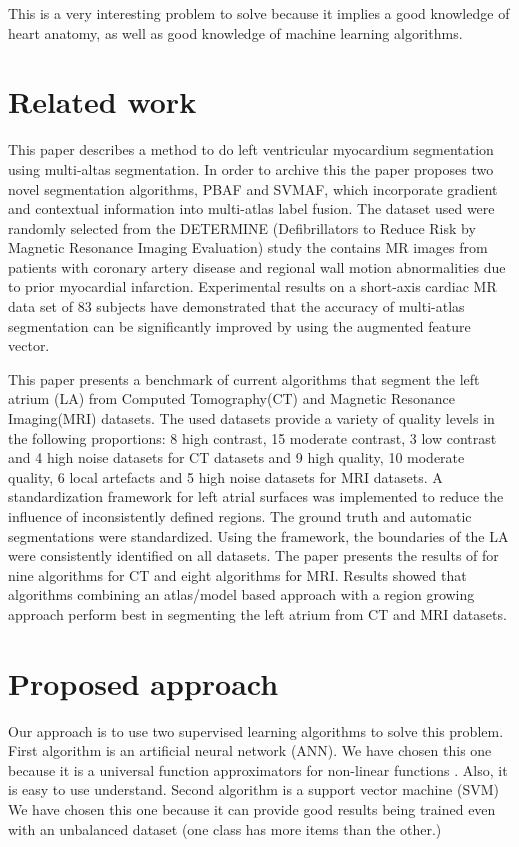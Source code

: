 \documentclass[12pt]{report}
\begin{document}
This is a very interesting problem to solve because it implies a good knowledge of heart anatomy, as well as good knowledge of machine learning algorithms. 

\chapter{Related work}
This paper \cite{bai1} describes a method to do left ventricular myocardium segmentation using multi-altas segmentation. In order to archive this the paper proposes two novel segmentation algorithms, PBAF and SVMAF, which incorporate gradient and contextual information into multi-atlas label fusion. The dataset used were randomly selected from the DETERMINE (Defibrillators to Reduce Risk by Magnetic Resonance Imaging Evaluation) study the contains MR images from patients with coronary artery disease and regional wall motion abnormalities due to prior myocardial infarction. Experimental results on a short-axis cardiac MR data set of 83 subjects have demonstrated that the accuracy of multi-atlas segmentation can be significantly improved by using the augmented feature vector.

This paper \cite{gomez1} presents a benchmark of current algorithms that segment the left atrium (LA) from  Computed Tomography(CT) and  Magnetic Resonance Imaging(MRI) datasets. The used datasets provide a variety of quality levels in the following proportions: 8 high contrast, 15 moderate contrast, 3 low contrast and 4 high noise datasets for CT datasets  and 9 high quality, 10 moderate quality, 6 local artefacts and 5 high noise datasets for MRI datasets. A standardization framework for left atrial surfaces was implemented  to reduce the influence of inconsistently defined regions. The ground truth and automatic segmentations were standardized. Using the framework, the boundaries of the LA were consistently identified on all datasets. The paper presents the results of  for nine algorithms for CT and eight algorithms for MRI. Results showed that algorithms combining an atlas/model based approach with a region growing approach perform best in segmenting the left atrium from CT and MRI datasets.

\chapter{Proposed approach}

Our approach is to use two supervised learning algorithms to solve this problem. First algorithm is an artificial neural network (ANN). We have chosen this one because it is a universal function approximators for non-linear functions \cite{annAdvantages}. Also, it is easy to use understand. Second algorithm is a support vector machine (SVM) We have chosen this one because it can provide good results being trained even with an unbalanced dataset (one class has more items than the other.)
\end{document}
